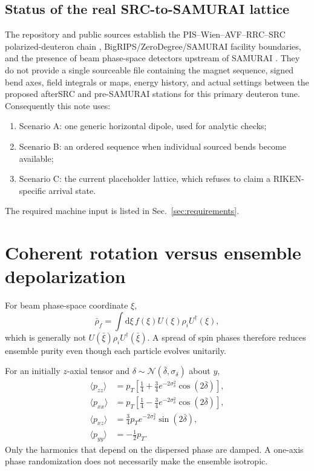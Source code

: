 \documentclass[11pt,a4paper]{article}
\newcommand{\pt}{p_T}
\newcommand{\dd}{\mathrm{d}}
\begin{document}
\subsection{Status of the real SRC-to-SAMURAI lattice}

The repository and public sources establish the PIS--Wien--AVF--RRC--SRC polarized-deuteron chain \citep{Sakamoto2016}, BigRIPS/ZeroDegree/SAMURAI facility boundaries, and the presence of beam phase-space detectors upstream of SAMURAI \citep{RIKENSAMURAI}.  They do not provide a single sourceable file containing the magnet sequence, signed bend axes, field integrals or maps, energy history, and actual settings between the proposed afterSRC and pre-SAMURAI stations for this primary deuteron tune.  Consequently this note uses:
\begin{enumerate}
 \item Scenario A: one generic horizontal dipole, used for analytic checks;
 \item Scenario B: an ordered sequence when individual sourced bends become available;
 \item Scenario C: the current placeholder lattice, which refuses to claim a RIKEN-specific arrival state.
\end{enumerate}
The required machine input is listed in Sec.~\ref{sec:requirements}.

\section{Coherent rotation versus ensemble depolarization}

For beam phase-space coordinate $\xi$,
\begin{equation}
 \bar\rho_f=\int\dd\xi\,f(\xi)U(\xi)\rho_iU^\dagger(\xi), \label{eq:ensemble}
\end{equation}
which is generally not $U(\bar\xi)\rho_iU^\dagger(\bar\xi)$.  A spread of spin phases therefore reduces ensemble purity even though each particle evolves unitarily.

For an initially $z$-axial tensor and $\delta\sim\mathcal N(\bar\delta,\sigma_\delta)$ about $y$,
\begin{align}
 \langle p_{zz}\rangle&=\pt\left[\frac14+\frac34e^{-2\sigma_\delta^2}\cos(2\bar\delta)\right],\\
 \langle p_{xx}\rangle&=\pt\left[\frac14-\frac34e^{-2\sigma_\delta^2}\cos(2\bar\delta)\right],\\
 \langle p_{xz}\rangle&=\frac34\pt e^{-2\sigma_\delta^2}\sin(2\bar\delta),\\
 \langle p_{yy}\rangle&=-\frac12\pt. \label{eq:gaussian}
\end{align}
Only the harmonics that depend on the dispersed phase are damped.  A one-axis phase randomization does not necessarily make the ensemble isotropic.
\end{document}
